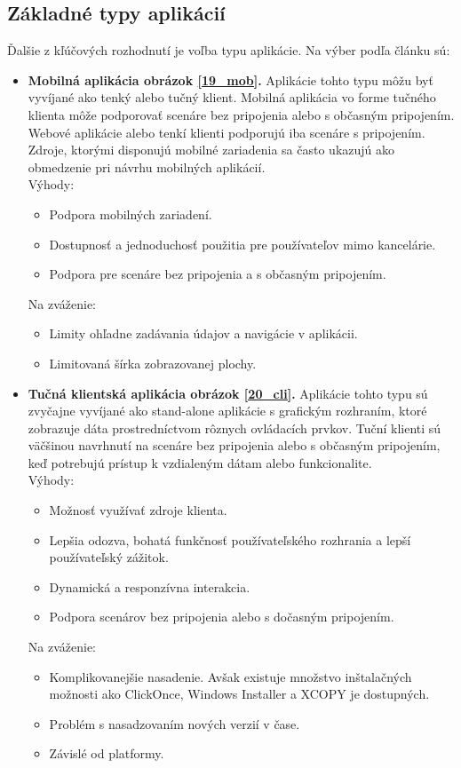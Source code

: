 \subsection{Základné typy aplikácií}
Ďalšie z kľúčových rozhodnutí je voľba typu aplikácie. Na výber podľa  článku \cite{IOT03} sú:
\begin{itemize}
\item
 \textbf{Mobilná aplikácia obrázok \ref{19_mob}.} Aplikácie tohto typu môžu byť vyvíjané ako tenký alebo tučný klient. Mobilná aplikácia vo forme tučného klienta môže podporovať scenáre bez pripojenia alebo s občasným pripojením. Webové aplikácie alebo tenkí klienti podporujú iba scenáre s pripojením. Zdroje, ktorými disponujú mobilné zariadenia sa často ukazujú ako obmedzenie pri návrhu mobilných aplikácií. \\
Výhody: 
 \begin{itemize}
   \item  Podpora mobilných zariadení.
   \item  Dostupnosť a jednoduchosť použitia pre používateľov mimo kancelárie.
   \item  Podpora pre scenáre bez pripojenia a s občasným pripojením.   
 \end{itemize}
Na zváženie: 
 \begin{itemize}
   \item Limity ohľadne zadávania údajov a navigácie v aplikácii.
   \item Limitovaná šírka zobrazovanej plochy.   
 \end{itemize}
 
\item
 \textbf{Tučná klientská aplikácia obrázok \ref{20_cli}.} Aplikácie tohto typu sú zvyčajne vyvíjané ako stand-alone aplikácie s grafickým rozhraním, ktoré zobrazuje dáta prostredníctvom rôznych ovládacích prvkov. Tuční klienti sú väčšinou navrhnutí na scenáre bez pripojenia alebo s občasným pripojením, keď potrebujú prístup k vzdialeným dátam alebo funkcionalite. \\
Výhody: 
 \begin{itemize}
   \item  Možnosť využívať zdroje klienta.
   \item  Lepšia odozva, bohatá funkčnosť používateľského rozhrania a lepší používateľský zážitok.
   \item  Dynamická a responzívna interakcia.
   \item Podpora scenárov bez pripojenia alebo s dočasným pripojením.   
 \end{itemize}
Na zváženie: 
 \begin{itemize}
   \item Komplikovanejšie nasadenie. Avšak existuje množstvo inštalačných možnosti ako ClickOnce, Windows Installer a XCOPY je dostupných.
   \item Problém s nasadzovaním nových verzií v čase.   
   \item Závislé od platformy.
 \end{itemize}


\end{itemize}
